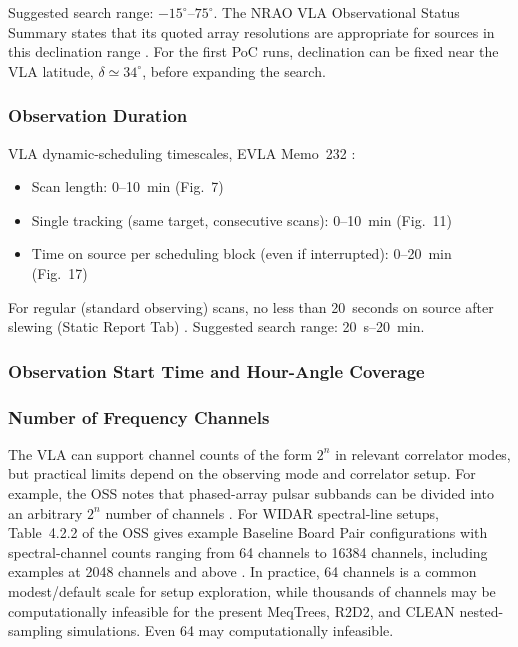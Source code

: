 \documentclass[11pt]{article}
\begin{document}
Suggested search range: $-15^\circ$--$75^\circ$.
The NRAO VLA Observational Status Summary states that its quoted array resolutions are appropriate for sources in this declination range \cite{nrao-vla-resolution}.
For the first PoC runs, declination can be fixed near the VLA latitude, $\delta \simeq 34^\circ$, before expanding the search.

\subsubsection{Observation Duration}
\label{sec:param-observation-duration}

VLA dynamic-scheduling timescales, EVLA Memo~232 \cite{faes2024evla232}:
\begin{itemize}
    \item Scan length: 0--10~min (Fig.~7)
    \item Single tracking (same target, consecutive scans): 0--10~min (Fig.~11)
    \item Time on source per scheduling block (even if interrupted): 0--20~min (Fig.~17)
\end{itemize}

For regular (standard observing) scans, no less than 20~seconds on source after slewing (Static Report Tab) \cite{nrao-vla-obsguide}.
Suggested search range: 20~s--20~min.

\subsubsection{Observation Start Time and Hour-Angle Coverage}

\subsubsection{Number of Frequency Channels}
\label{sec:param-channel-count}

The VLA can support channel counts of the form $2^n$ in relevant correlator modes, but practical limits depend on the observing mode and correlator setup.
For example, the OSS notes that phased-array pulsar subbands can be divided into an arbitrary $2^n$ number of channels \cite{nrao-vla-oss}.
For WIDAR spectral-line setups, Table~4.2.2 of the OSS gives example Baseline Board Pair configurations with spectral-channel counts ranging from 64 channels to 16384 channels, including examples at 2048 channels and above \cite{nrao-vla-oss}.
In practice, 64 channels is a common modest/default scale for setup exploration, while thousands of channels may be computationally infeasible for the present MeqTrees, R2D2, and CLEAN nested-sampling simulations.
Even 64 may computationally infeasible.
\end{document}
